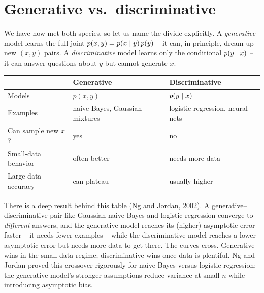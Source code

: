 \section{Generative vs.\ discriminative}
\label{ch34:gen-disc}

We have now met both species, so let us name the divide explicitly. A
\emph{generative} model learns the full joint $p(x,y) = p(x\mid y)\,p(y)$ -- it
can, in principle, dream up new $(x,y)$ pairs. A \emph{discriminative} model
learns only the conditional $p(y\mid x)$ -- it can answer questions about $y$
but cannot generate $x$.

\begin{center}
\begin{tabular}{@{}lll@{}}
\toprule
 & \textbf{Generative} & \textbf{Discriminative} \\
\midrule
Models & $p(x,y)$ & $p(y\mid x)$ \\
Examples & naive Bayes, Gaussian mixtures & logistic regression, neural nets \\
Can sample new $x$? & yes & no \\
Small-data behavior & often better & needs more data \\
Large-data accuracy & can plateau & usually higher \\
\bottomrule
\end{tabular}
\end{center}

\begin{happeningbox}
There is a deep result behind this table (Ng and Jordan, 2002). A
generative--discriminative pair like Gaussian naive Bayes and logistic regression
converge to \emph{different} answers, and the generative model reaches its
(higher) asymptotic error faster -- it needs fewer examples -- while the
discriminative model reaches a lower asymptotic error but needs more data to get
there. The curves cross. Generative wins in the small-data regime; discriminative
wins once data is plentiful. Ng and Jordan proved this crossover rigorously for naive Bayes versus logistic regression:
the generative model's stronger assumptions reduce variance at small $n$ while introducing asymptotic bias.
\end{happeningbox}

